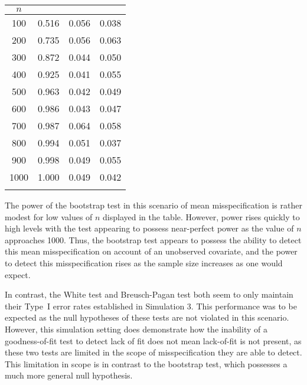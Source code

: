 		\begin{table}[H]
			\centering
			\small\addtolength{\tabcolsep}{-3pt}
			\setlength\extrarowheight{-3pt}
			{
			\begin{tabular}{ c|c|c|c}
			$n$ & \vtop{\hbox{\strut Bootstrap}\hbox{\strut Test}} & \vtop{\hbox{\strut White}\hbox{\strut Test}} & \vtop{\hbox{\strut Breusch-Pagan} \hbox{\strut Test}} \\
			 \hline
			 100 & 0.516 & 0.056 & 0.038 \\
			 200 & 0.735 & 0.056 & 0.063 \\
			 300 & 0.872 & 0.044 & 0.050 \\
			 400 & 0.925 & 0.041 & 0.055 \\
			 500 & 0.963 & 0.042 & 0.049 \\
			 600 & 0.986 & 0.043 & 0.047 \\
			 700 & 0.987 & 0.064 & 0.058 \\
			 800 & 0.994 & 0.051 & 0.037 \\
			 900 & 0.998 & 0.049 & 0.055 \\
			 1000 & 1.000 & 0.049 & 0.042 \\
			 
			 \Xhline{3\arrayrulewidth}
			\end{tabular}
			}
		\end{table}

		The power of the bootstrap test in this scenario of mean misspecification is rather modest for low values of $n$ displayed in the table. However, power rises quickly to high levels
		with the test appearing to possess near-perfect power as the value of $n$ approaches 1000. Thus, the bootstrap test appears to possess the ability to detect this mean
		misspecification on account of an unobserved covariate, and the power to detect this misspecification rises as the sample size increases as one would expect.

		In contrast, the White test and Breusch-Pagan test both seem to only maintain their Type~I error rates established in Simulation 3. This performance was to be expected
		as the null hypotheses of these tests are not violated in this scenario. However, this simulation setting does demonstrate how the inability of a goodness-of-fit test to detect lack of
		fit does not mean lack-of-fit is not present, as these two tests are limited in the scope of misspecification they are able to detect. This limitation in scope is in contrast to the
		bootstrap test, which possesses a much more general null hypothesis.

